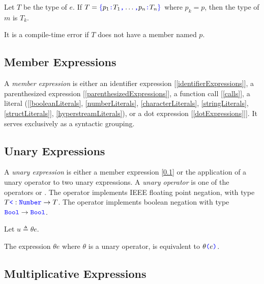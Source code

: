 \documentclass{article}
\begin{document}
Let $T$ be the type of $e$. If $T = \texttt{\color{blue} $\{$}{}p_1\texttt{\color{blue} :}{} T_1\texttt{\color{blue} ,}{} \ldots\texttt{\color{blue} ,}{} p_n\texttt{\color{blue} :}{} T_n\texttt{\color{blue} $\}$}$ where $p_k = p$, then the type of $m$ is $T_k$. 

It is a compile-time error if $T$ does not have a member named $p$. 

\subsection{Member Expressions}
\label{memberExpression}

A {\em member expression} is either an identifier expression [\ref{identifierExpressions}], a parenthesized expression [\ref{parenthesizedExpressions}], a function call [\ref{calls}], a literal ([\ref{booleanLiterals}, \ref{numberLiterals}, \ref{characterLiterals}, \ref{stringLiterals}, \ref{structLiterals}], \ref{hyperstreamLiterals}), or a dot expression [\ref{dotExpressions}]]. It serves exclusively as a syntactic grouping.


\subsection{Unary Expressions}
\label{unaryExpressions}

A {\em unary expression} is either a member expression [\ref{memberExpression}] or the application of a unary operator to two unary expressions.
A {\em unary operator} is one of the operators \MINUS{} or  \NOT{}. The \MINUS{} operator implements IEEE floating point negation, with type $T \texttt{\color{blue} \tt<}: \texttt{\color{blue} Number}{} \to T$. The \NOT{} operator implements boolean negation with type $\texttt{\color{blue} Bool}{} \to \texttt{\color{blue} Bool}$.

\UnaryExpression{}

Let $u \triangleq \theta{} e$.

The expression $\theta e$ where $\theta$ is a unary operator, is equivalent to $\theta\texttt{\color{blue} (}{}e\texttt{\color{blue} )}{}$.

\subsection{Multiplicative Expressions}
\label{multiplicativeExpressions}
\end{document}
